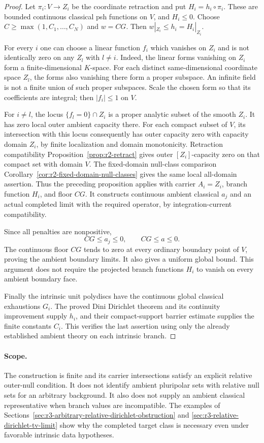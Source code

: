\documentclass[11pt,a4paper]{article}
\numberwithin{equation}{section}
\theoremstyle{definition}
\theoremstyle{remark}
\begin{document}
\begin{proof}
Let $\pi_i:V\to Z_i$ be the coordinate retraction and put
$H_i=h_i\circ\pi_i$. These are bounded continuous classical
psh functions on $V$, and $H_i\leq0$. Choose
$C\geq\max(1,C_1,\ldots,C_N)$ and $w=CG$. Then
$w|_{Z_i}\leq h_i=H_i|_{Z_i}$.

For every $i$ one can choose a linear function $f_i$ which
vanishes on $Z_i$ and is not identically zero on any $Z_l$
with $l\ne i$. Indeed, the linear forms vanishing on $Z_i$
form a finite-dimensional $K$-space. For each distinct
same-dimensional coordinate space $Z_l$, the forms also
vanishing there form a proper subspace. An infinite field
is not a finite union of such proper subspaces. Scale the
chosen form so that its coefficients are integral; then
$|f_i|\leq1$ on $V$.

For $i\ne l$, the locus $\{f_l=0\}\cap Z_i$ is a proper
analytic subset of the smooth $Z_i$. It has zero local outer
ambient capacity there. For each compact subset of $V$, its
intersection with this locus consequently has outer capacity zero
with capacity domain $Z_i$, by finite localization and domain
monotonicity. Retraction compatibility
Proposition~\ref{prop:r2-retract} gives outer
$[Z_i]$-capacity zero on that compact set with domain $V$.
The fixed-domain null-class comparison
Corollary~\ref{cor:r2-fixed-domain-null-classes} gives the
same local all-domain assertion. Thus the preceding proposition
applies with carrier $A_i=Z_i$, branch function $H_i$, and
floor $CG$. It constructs continuous ambient classical $a_j$
and an actual completed limit with the required operator, by
integration-current compatibility.

Since all penalties are nonpositive,
\[
 CG\leq a_j\leq0,\qquad CG\leq a\leq0.
\]
The continuous floor $CG$ tends to zero at every ordinary
boundary point of $V$, proving the ambient boundary limits.
It also gives a uniform global bound. This argument does not
require the projected branch functions $H_i$ to vanish on
every ambient boundary face.

Finally the intrinsic unit polydiscs have the continuous
global classical exhaustions $G_i$. The proved Dini Dirichlet
theorem and its continuity improvement supply $h_i$, and their
compact-support barrier estimate supplies the finite constants
$C_i$. This verifies the last assertion using only the
already established ambient theory on each intrinsic branch.
\end{proof}

\paragraph{Scope.}
The construction is finite and its carrier intersections satisfy
an explicit relative outer-null condition. It does not identify
ambient pluripolar sets with relative null sets for an arbitrary
background. It also does not supply an ambient classical
representative when branch values are incompatible. The examples
of Sections~\ref{sec:r3-arbitrary-relative-dirichlet-obstruction}
and \ref{sec:r3-relative-dirichlet-tv-limit} show why the
completed target class is necessary even under favorable
intrinsic data hypotheses.
\end{document}
